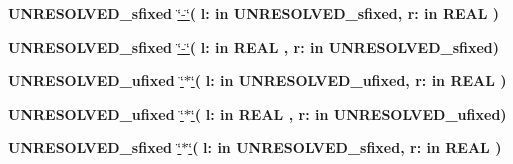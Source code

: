 \begin{DoxyCompactItemize}
\item 
{\bfseries {\bfseries \textcolor{vhdlchar}{U\+N\+R\+E\+S\+O\+L\+V\+E\+D\+\_\+sfixed}\textcolor{vhdlchar}{ }}} \hyperlink{class__fixed__pkg_ac2f01ba70fd51fb20393648e564e9cf8}{\char`\"{}-\/\char`\"{}}{\bfseries  ( }{\bfseries \textcolor{vhdlchar}{l\+: }\textcolor{stringliteral}{in }\textcolor{vhdlchar}{U\+N\+R\+E\+S\+O\+L\+V\+E\+D\+\_\+sfixed}}{\bfseries  , \textcolor{vhdlchar}{r\+: }\textcolor{stringliteral}{in }{\bfseries \textcolor{comment}{R\+E\+A\+L}\textcolor{vhdlchar}{ }}}{\bfseries  )} 
\item 
{\bfseries {\bfseries \textcolor{vhdlchar}{U\+N\+R\+E\+S\+O\+L\+V\+E\+D\+\_\+sfixed}\textcolor{vhdlchar}{ }}} \hyperlink{class__fixed__pkg_ac2f01ba70fd51fb20393648e564e9cf8}{\char`\"{}-\/\char`\"{}}{\bfseries  ( }{\bfseries \textcolor{vhdlchar}{l\+: }\textcolor{stringliteral}{in }{\bfseries \textcolor{comment}{R\+E\+A\+L}\textcolor{vhdlchar}{ }}}{\bfseries  , \textcolor{vhdlchar}{r\+: }\textcolor{stringliteral}{in }\textcolor{vhdlchar}{U\+N\+R\+E\+S\+O\+L\+V\+E\+D\+\_\+sfixed}}{\bfseries  )} 
\item 
{\bfseries {\bfseries \textcolor{vhdlchar}{U\+N\+R\+E\+S\+O\+L\+V\+E\+D\+\_\+ufixed}\textcolor{vhdlchar}{ }}} \hyperlink{class__fixed__pkg_a72ee02603ebb0ddcc88451a45e24e9e0}{\char`\"{}$\ast$\char`\"{}}{\bfseries  ( }{\bfseries \textcolor{vhdlchar}{l\+: }\textcolor{stringliteral}{in }\textcolor{vhdlchar}{U\+N\+R\+E\+S\+O\+L\+V\+E\+D\+\_\+ufixed}}{\bfseries  , \textcolor{vhdlchar}{r\+: }\textcolor{stringliteral}{in }{\bfseries \textcolor{comment}{R\+E\+A\+L}\textcolor{vhdlchar}{ }}}{\bfseries  )} 
\item 
{\bfseries {\bfseries \textcolor{vhdlchar}{U\+N\+R\+E\+S\+O\+L\+V\+E\+D\+\_\+ufixed}\textcolor{vhdlchar}{ }}} \hyperlink{class__fixed__pkg_a72ee02603ebb0ddcc88451a45e24e9e0}{\char`\"{}$\ast$\char`\"{}}{\bfseries  ( }{\bfseries \textcolor{vhdlchar}{l\+: }\textcolor{stringliteral}{in }{\bfseries \textcolor{comment}{R\+E\+A\+L}\textcolor{vhdlchar}{ }}}{\bfseries  , \textcolor{vhdlchar}{r\+: }\textcolor{stringliteral}{in }\textcolor{vhdlchar}{U\+N\+R\+E\+S\+O\+L\+V\+E\+D\+\_\+ufixed}}{\bfseries  )} 
\item 
{\bfseries {\bfseries \textcolor{vhdlchar}{U\+N\+R\+E\+S\+O\+L\+V\+E\+D\+\_\+sfixed}\textcolor{vhdlchar}{ }}} \hyperlink{class__fixed__pkg_adc75e260eb741edc3aae92fed900c09a}{\char`\"{}$\ast$\char`\"{}}{\bfseries  ( }{\bfseries \textcolor{vhdlchar}{l\+: }\textcolor{stringliteral}{in }\textcolor{vhdlchar}{U\+N\+R\+E\+S\+O\+L\+V\+E\+D\+\_\+sfixed}}{\bfseries  , \textcolor{vhdlchar}{r\+: }\textcolor{stringliteral}{in }{\bfseries \textcolor{comment}{R\+E\+A\+L}\textcolor{vhdlchar}{ }}}{\bfseries  )} 

\end{DoxyCompactItemize}
